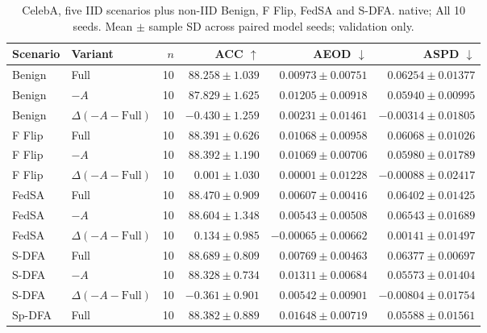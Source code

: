 \begin{table}[t]
\centering
\small
\caption{CelebA, five IID scenarios plus non-IID Benign, F Flip, FedSA and S-DFA. native; All 10 seeds. Mean $\pm$ sample SD across paired model seeds; validation only.}
\begin{tabular}{llrrrr}
\toprule
Scenario & Variant & $n$ & ACC $\uparrow$ & AEOD $\downarrow$ & ASPD $\downarrow$ \\
\midrule
Benign & Full & 10 & $88.258 \pm 1.039$ & $0.00973 \pm 0.00751$ & $0.06254 \pm 0.01377$ \\
Benign & $-A$ & 10 & $87.829 \pm 1.625$ & $0.01205 \pm 0.00918$ & $0.05940 \pm 0.00995$ \\
Benign & $\Delta(-A-\mathrm{Full})$ & 10 & $-0.430 \pm 1.259$ & $0.00231 \pm 0.01461$ & $-0.00314 \pm 0.01805$ \\
F Flip & Full & 10 & $88.391 \pm 0.626$ & $0.01068 \pm 0.00958$ & $0.06068 \pm 0.01026$ \\
F Flip & $-A$ & 10 & $88.392 \pm 1.190$ & $0.01069 \pm 0.00706$ & $0.05980 \pm 0.01789$ \\
F Flip & $\Delta(-A-\mathrm{Full})$ & 10 & $0.001 \pm 1.030$ & $0.00001 \pm 0.01228$ & $-0.00088 \pm 0.02417$ \\
FedSA & Full & 10 & $88.470 \pm 0.909$ & $0.00607 \pm 0.00416$ & $0.06402 \pm 0.01425$ \\
FedSA & $-A$ & 10 & $88.604 \pm 1.348$ & $0.00543 \pm 0.00508$ & $0.06543 \pm 0.01689$ \\
FedSA & $\Delta(-A-\mathrm{Full})$ & 10 & $0.134 \pm 0.985$ & $-0.00065 \pm 0.00662$ & $0.00141 \pm 0.01497$ \\
S-DFA & Full & 10 & $88.689 \pm 0.809$ & $0.00769 \pm 0.00463$ & $0.06377 \pm 0.00697$ \\
S-DFA & $-A$ & 10 & $88.328 \pm 0.734$ & $0.01311 \pm 0.00684$ & $0.05573 \pm 0.01404$ \\
S-DFA & $\Delta(-A-\mathrm{Full})$ & 10 & $-0.361 \pm 0.901$ & $0.00542 \pm 0.00901$ & $-0.00804 \pm 0.01754$ \\
Sp-DFA & Full & 10 & $88.382 \pm 0.889$ & $0.01648 \pm 0.00719$ & $0.05588 \pm 0.01561$ \\

\end{tabular}
\end{table}

